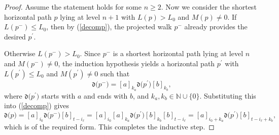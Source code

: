 \documentclass[10pt,a4paper]{amsart}
\begin{document}
\begin{proof}
Assume the statement holds for some $n\geq 2$. Now we consider the shortest
horizontal path $p$ lying at level $n+1$ with $L(p)>L_{0}$ and $M(p)\neq 0$.
If $L(p^{-})\leq L_{0}$, then by (\ref{decomp}), the projected walk $p^{-}$
already provides the desired $p^{\prime }$.

Otherwise $L(p^{-})>L_{0}$. Since $p^{-}$ is a shortest horizontal path
lying at level $n$ and $M(p^{-})\neq 0$, the induction hypothesis yields a
horizontal path $p^{\prime }$ with $L(p^{\prime })\leq L_{0}$ and $%
M(p^{\prime })\neq 0$ such that 
\begin{equation*}
\mathfrak{d(}p^{-})=[a]_{k_{a}}\mathfrak{d(}p^{\prime })[b]_{k_{b}},
\end{equation*}%
where $\mathfrak{d(}p^{\prime })$ starts with $a$ and ends with $b$, and $%
k_{a},k_{b}\in \mathbb{N}\cup \{0\}$. Substituting this into (\ref{decomp})
gives 
\begin{equation*}
\mathfrak{d(}p)=[a]_{i_{0}}\mathfrak{d(}p^{-})[b]_{t-i_{\ell
}}=[a]_{i_{0}}[a]_{k_{a}}\mathfrak{d(}p^{\prime })[b]_{k_{b}}[b]_{t-i_{\ell
}}=[a]_{i_{0}+k_{a}}\mathfrak{d(}p^{\prime })[b]_{t-i_{\ell }+k_{b}},
\end{equation*}%
which is of the required form. This completes the inductive step.
\end{proof}
\end{document}
